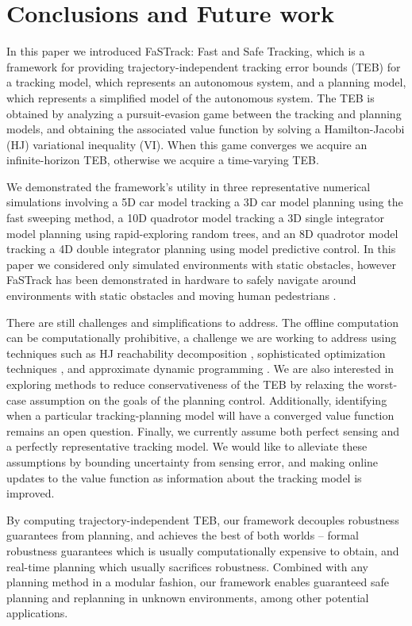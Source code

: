 \section{Conclusions and Future work}
In this paper we introduced FaSTrack: Fast and Safe Tracking, which is a framework for providing trajectory-independent tracking error bounds (TEB) for a tracking model, which represents an autonomous system, and a planning model, which represents a simplified model of the autonomous system.
The TEB is obtained by analyzing a pursuit-evasion game between the tracking and planning models, and obtaining the associated value function by solving a Hamilton-Jacobi (HJ) variational inequality (VI).  When this game converges we acquire an infinite-horizon TEB, otherwise we acquire a time-varying TEB.

We demonstrated the framework's utility in three representative numerical simulations involving a 5D car model tracking a 3D car model planning using the fast sweeping method, a 10D quadrotor model tracking a 3D single integrator model planning using rapid-exploring random trees, and an 8D quadrotor model tracking a 4D double integrator planning using model predictive control.  In this paper we considered only simulated environments with static obstacles, however FaSTrack has been demonstrated in hardware to safely navigate around environments with static obstacles \cite{fridovich2018} and moving human pedestrians \cite{fisac2018probabilistically}.

There are still challenges and simplifications to address. The offline computation can be computationally prohibitive, a challenge we are working to address using techniques such as HJ reachability decomposition \cite{Chen2016DecouplingJournal,Chen2016DecouplingApprox}, sophisticated optimization techniques , and approximate dynamic programming \cite{royo2018classification}.  We are also interested in exploring methods to reduce conservativeness of the TEB by relaxing the worst-case assumption on the goals of the planning control.  Additionally, identifying when a particular tracking-planning model will have a converged value function remains an open question.  Finally, we currently assume both perfect sensing and a perfectly representative tracking model.  We would like to alleviate these assumptions by bounding uncertainty from sensing error, and making online updates to the value function as information about the tracking model is improved.

By computing trajectory-independent TEB, our framework decouples robustness guarantees from planning, and achieves the best of both worlds -- formal robustness guarantees which is usually computationally expensive to obtain, and real-time planning which usually sacrifices robustness.
Combined with any planning method in a modular fashion, our framework enables guaranteed safe planning and replanning in unknown environments, among other potential applications.